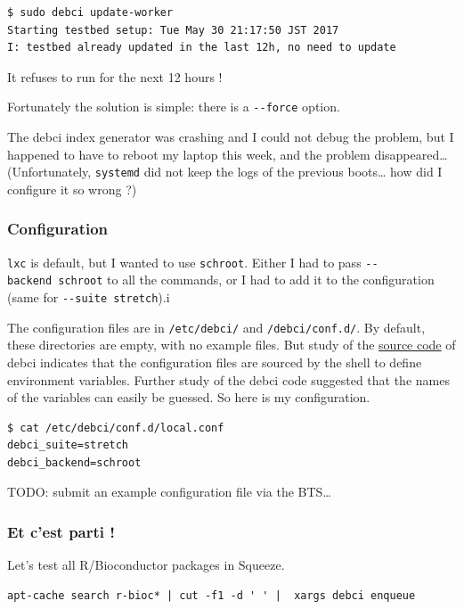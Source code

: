 \documentclass[mingoth,a4paper]{jsarticle}
\begin{document}
{{\begin{verbatim}
$ sudo debci update-worker
Starting testbed setup: Tue May 30 21:17:50 JST 2017
I: testbed already updated in the last 12h, no need to update
\end{verbatim}

It refuses to run for the next 12 hours !

Fortunately the solution is simple: there is a \texttt{-\/-force}
option.

The debci index generator was crashing and I could not debug the
problem, but I happened to have to reboot my laptop this week, and the
problem disappeared\ldots{} (Unfortunately, \texttt{systemd} did not
keep the logs of the previous boots\ldots{} how did I configure it so
wrong ?)

\subsubsection{Configuration}\label{configuration}

\texttt{lxc} is default, but I wanted to use \texttt{schroot}. Either I
had to pass \texttt{-\/-backend\ schroot} to all the commands, or I had
to add it to the configuration (same for \texttt{-\/-suite\ stretch}).i

The configuration files are in \texttt{/etc/debci/} and
\texttt{/debci/conf.d/}. By default, these directories are empty, with
no example files. But study of the
\href{https://github.com/terceiro/debci/blob/master/lib/environment.sh}{source
code} of debci indicates that the configuration files are sourced by the
shell to define environment variables. Further study of the debci code
suggested that the names of the variables can easily be guessed. So here
is my configuration.

\begin{verbatim}
$ cat /etc/debci/conf.d/local.conf 
debci_suite=stretch
debci_backend=schroot
\end{verbatim}

TODO: submit an example configuration file via the BTS\ldots{}

\subsubsection{Et c'est parti !}\label{et-cest-parti}

Let's test all R/Bioconductor packages in Squeeze.

\begin{verbatim}
apt-cache search r-bioc* | cut -f1 -d ' ' |  xargs debci enqueue
\end{verbatim}

}}
\end{document}
